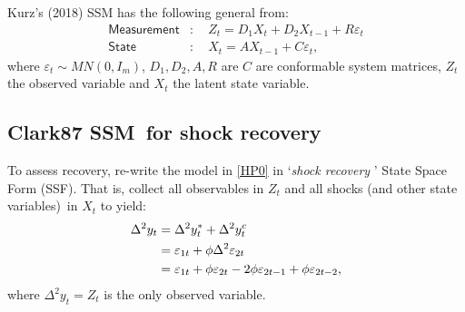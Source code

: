 \documentclass[a4paper,12pt]{article}
\newcommand{\bsq}{\begin{subequations}}\newcommand{\esq}{\end{subequations}}
\begin{document}
Kurz's (2018) SSM has the following general from:\bsq\label{SSM}%
\begin{align}
\mathsf{Measurement}& :\quad Z_{t}=D_{1}X_{t}+D_{2}X_{t-1}+R\varepsilon _{t}
\label{ssm1} \\
\mathsf{State}& :\quad X_{t}=AX_{t-1}+C\varepsilon _{t},  \label{ssm2}
\end{align}%
\esq where $\varepsilon _{t}\sim MN(0,I_{m})$, $D_{1},D_{2},A,R$ are $C$ are
conformable system matrices, $Z_{t}$ the observed variable and $X_{t}$ the
latent state variable.

\subsection{Clark87 SSM\ for shock recovery}

To assess recovery, re-write the model in \ref{HP0} in `\emph{shock recovery}%
' State Space Form (SSF). That is, collect all observables in $Z_{t}$ and
all shocks (and other state variables)\ in $X_{t}$ to yield:%
\begin{align}
\Delta ^{2}y_{t}& =\Delta ^{2}y_{t}^{\ast }+\Delta ^{2}y_{t}^{c}  \notag \\
& =\varepsilon _{1t}+\phi \Delta ^{2}\varepsilon _{2t}  \notag \\
& =\varepsilon _{1t}+\phi \varepsilon _{2t}-2\phi \varepsilon _{2t-1}+\phi
\varepsilon _{2t-2},  \label{Z}
\end{align}%
where $\Delta ^{2}y_{t}=Z_{t}$ is the only observed variable.
\end{document}
